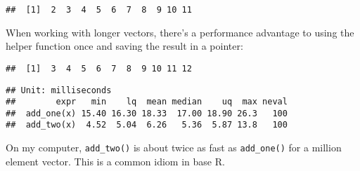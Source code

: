 \begin{verbatim}
##  [1]  2  3  4  5  6  7  8  9 10 11
\end{verbatim}

When working with longer vectors, there's a performance advantage to
using the helper function once and saving the result in a pointer:

\begin{Shaded}
\begin{Highlighting}[]
\StringTok{ }\NormalTok{(}\NormalTok{(} \NormalTok{), }


\StringTok{  \}}

\NormalTok{)}
\NormalTok{(}\NormalTok{(}\OperatorTok{:}\NormalTok{))}
\end{Highlighting}
\end{Shaded}

\begin{verbatim}
##  [1]  3  4  5  6  7  8  9 10 11 12
\end{verbatim}

\begin{Shaded}
\begin{Highlighting}[]
\StringTok{ }\NormalTok{(}\OperatorTok{:}\NormalTok{)}
\NormalTok{(}
\NormalTok{)}
\end{Highlighting}
\end{Shaded}

\begin{verbatim}
## Unit: milliseconds
##        expr   min    lq  mean median    uq  max neval
##  add_one(x) 15.40 16.30 18.33  17.00 18.90 26.3   100
##  add_two(x)  4.52  5.04  6.26   5.36  5.87 13.8   100
\end{verbatim}

On my computer, \texttt{add\_two()} is about twice as fast as
\texttt{add\_one()} for a million element vector. This is a common idiom
in base R.

